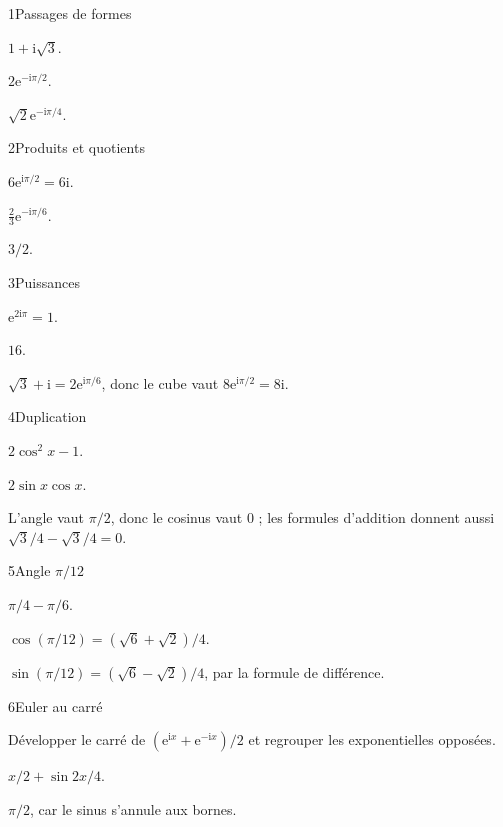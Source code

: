\begin{corrige}{1}{Passages de formes}
\begin{questions}
\item $1+\mathrm i\sqrt3$.
\item $2\mathrm e^{-\mathrm i\pi/2}$.
\item $\sqrt2\mathrm e^{-\mathrm i\pi/4}$.
\end{questions}
\end{corrige}
\begin{corrige}{2}{Produits et quotients}
\begin{questions}
\item $6\mathrm e^{\mathrm i\pi/2}=6\mathrm i$.
\item $\tfrac23\mathrm e^{-\mathrm i\pi/6}$.
\item $3/2$.
\end{questions}
\end{corrige}
\begin{corrige}{3}{Puissances}
\begin{questions}
\item $\mathrm e^{2\mathrm i\pi}=1$.
\item $16$.
\item $\sqrt3+\mathrm i=2\mathrm e^{\mathrm i\pi/6}$, donc le cube vaut $8\mathrm e^{\mathrm i\pi/2}=8\mathrm i$.
\end{questions}
\end{corrige}
\begin{corrige}{4}{Duplication}
\begin{questions}
\item $2\cos^2x-1$.
\item $2\sin x\cos x$.
\item L’angle vaut $\pi/2$, donc le cosinus vaut $0$ ; les formules d’addition donnent aussi $\sqrt3/4-\sqrt3/4=0$.
\end{questions}
\end{corrige}
\begin{corrige}{5}{Angle $\pi/12$}
\begin{questions}
\item $\pi/4-\pi/6$.
\item $\cos(\pi/12)=(\sqrt6+\sqrt2)/4$.
\item $\sin(\pi/12)=(\sqrt6-\sqrt2)/4$, par la formule de différence.
\end{questions}
\end{corrige}
\begin{corrige}{6}{Euler au carré}
\begin{questions}
\item Développer le carré de $(\mathrm e^{\mathrm ix}+\mathrm e^{-\mathrm ix})/2$ et regrouper les exponentielles opposées.
\item $x/2+\sin2x/4$.
\item $\pi/2$, car le sinus s’annule aux bornes.
\end{questions}
\end{corrige}
